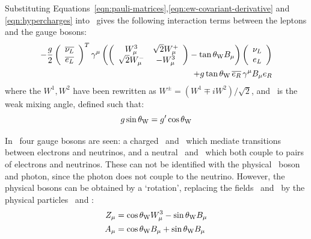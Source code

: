 Substituting
Equations~\ref{eqn:pauli-matrices},\ref{eqn:ew-covariant-derivative} and \ref{eqn:hypercharges}
 into~ gives the following
interaction terms between the leptons and the gauge bosons:
\begin{equation}
\begin{split}
- \frac{g}{2}
\left( \begin{array}{c}\overline{\nu_{L}} \\  \overline{e_{L}} \end{array} \right)^{T}
\gamma^{\mu} \left(
\left( \begin{array}{cc} W^{3}_{\mu} & \sqrt{2} W^{+}_{\mu} \\ \sqrt{2} W^{-}_{\mu} & -
W^{3}_{\mu} \end{array} \right)
- \tan{\ensuremath{\theta_{\mathrm{W}}}} B_{\mu} \right)
\left( \begin{array}{c} \nu_{L} \\  e_{L} \end{array} \right) \\
+ g \tan{\ensuremath{\theta_{\mathrm{W}}}} \, \overline{e_{R}} \, \gamma^{\mu} B_{\mu} e_{R}
\end{split}
\label{eqn:ew-lepton-interactions}
\end{equation}
where the $W^{1}, W^{2}$ have been rewritten as $W^{\pm} = (W^{1} \mp
iW^{2})/\sqrt{2}$, and \thetaW\ is the weak mixing angle, defined such that:
\begin{equation}
g \sin{\ensuremath{\theta_{\mathrm{W}}}} = g' \cos{\ensuremath{\theta_{\mathrm{W}}}}
\end{equation}

In~ four gauge bosons are seen: a charged \Wp\ and
\Wm\ which mediate transitions between electrons and neutrinos, and a neutral
\Wthreemu\ and \Bmu\ which both couple to pairs of electrons and neutrinos.
These can not be identified with the physical \Z\ boson and photon, since the
photon does not couple to the neutrino.  However, the physical bosons can be
obtained by a `rotation', replacing the fields \Wthreemu\ and \Bmu\ by the
physical particles \Zmu\ and \Amu:
\begin{align}
Z_{\mu} & = \cos{\ensuremath{\theta_{\mathrm{W}}}} W^{3}_{\mu} - \sin{\ensuremath{\theta_{\mathrm{W}}}} B_{\mu} \\
A_{\mu} & = \cos{\ensuremath{\theta_{\mathrm{W}}}} B_{\mu} + \sin{\ensuremath{\theta_{\mathrm{W}}}} B_{\mu}
\end{align}

